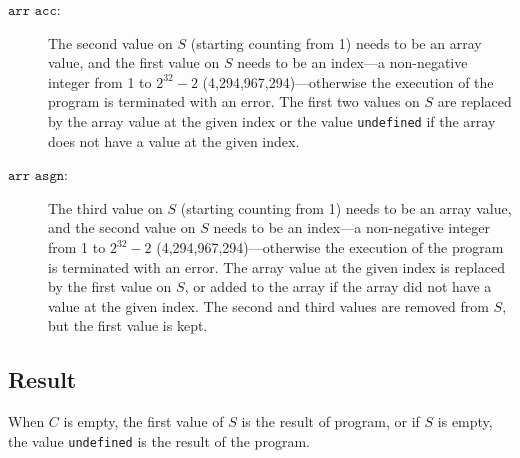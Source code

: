 \begin{description}
\item[$\texttt{arr acc}$:]
The second value on $S$ (starting counting from 1) needs to be an array value, and the first
value on $S$ needs to be an index---a non-negative integer from 1 to $2^{32} - 2$
(4,294,967,294)---otherwise the execution of the program is terminated with an error.
The first two values on $S$ are replaced by 
the array value at the given index or
the value \texttt{undefined}
if the array does not have a value at the given index.

\item[$\texttt{arr asgn}$:]
The third value on $S$ (starting counting from 1) needs to be an array value, and the second
value on $S$ needs to be an index---a non-negative integer from 1 to $2^{32} - 2$
(4,294,967,294)---otherwise the execution of the program is terminated with an error.
The array value at the given index is replaced by the first value on $S$, or added
to the array if the array did not have a value at the given index.
The second and third values are removed from $S$, but the first value is kept.

\end{description}

\subsection*{Result}

When $C$ is empty, 
the first value of $S$ is the result of program, or if $S$ is empty,
the value \lstinline{undefined} is the result of the program.


